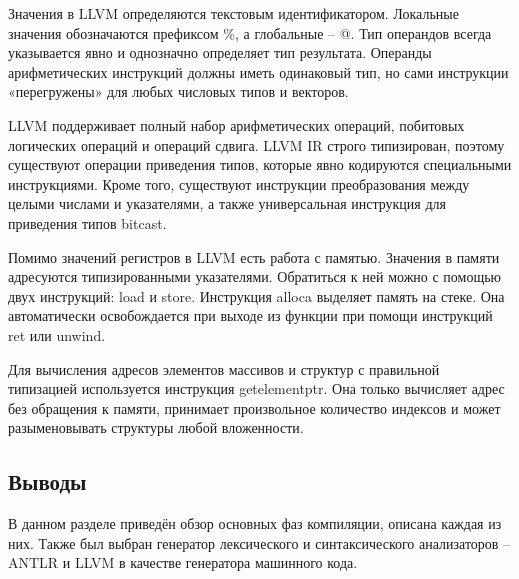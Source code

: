 Значения в LLVM определяются текстовым идентификатором. Локальные значения обозначаются префиксом \%, а глобальные – @. Тип операндов всегда указывается явно и однозначно определяет тип результата. Операнды арифметических инструкций должны иметь одинаковый тип, но сами инструкции «перегружены» для любых числовых типов и векторов.

LLVM поддерживает полный набор арифметических операций, побитовых логических операций и операций сдвига. LLVM IR строго типизирован, поэтому существуют
операции приведения типов, которые явно кодируются специальными инструкциями. Кроме того, существуют инструкции преобразования между целыми числами и
указателями, а также универсальная инструкция для приведения типов bitcast.

Помимо значений ­регистров в LLVM есть работа с памятью. Значения в памяти адресуются типизированными указателями. Обратиться к ней можно с помощью двух инструкций: load и store. Инструкция alloca выделяет память на стеке. Она автоматически освобождается при выходе из функции при помощи инструкций ret или unwind.

Для вычисления адресов элементов массивов и структур с правильной типизацией используется инструкция getelementptr. Она только вычисляет
адрес без обращения к памяти, принимает произвольное количество индексов и может разыменовывать структуры любой вложенности. \\

\subsection*{Выводы}
В данном разделе приведён обзор основных фаз компиляции, описана каждая из них. Также был выбран генератор лексического и синтаксического анализаторов -- ANTLR и LLVM в качестве генератора машинного кода. 

\pagebreak